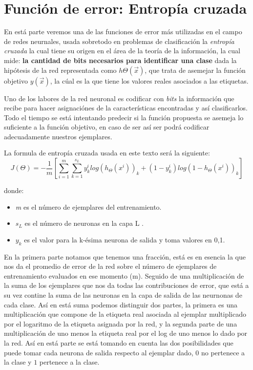 \section{Función de error: Entropía cruzada}
En está parte veremos una de las funciones de error más utilizadas en el campo de redes neurnales, usada sobretodo en problemas de clasificación la \emph{entropía cruzada} la cual tiene su origen en el área de la teoría de la información, la cual mide: \textbf{la cantidad de bits necesarios para identificar una clase} dada la hipótesis de la red representada como $h\Theta (\vec{x}) $, que trata de asemejar la función objetivo $y(\vec{x})$, la cúal es la que tiene los valores reales asociados a las etiquetas.

Uno de los labores de la red neuronal es codificar con \emph{bits} la información que recibe para hacer asignaciónes de la características encontradas y así clasificarlos. Todo el tiempo se está intentando predecir si la función propuesta se asemeja lo suficiente a la función objetivo, en caso de ser así ser podrá codificar adecuadamente nuestros ejemplares.

La formula de entropía cruzada usada en este texto será la siguiente:
 \begin{equation}
  J (\Theta) = -\dfrac{1}{m}\left[\sum_{i=1}^{m}\sum_{k=1}^{s_{L}}y_{k}^{i} log( h_{\Theta}(x^i))_{k}+(1-y_{k}^{i})log(1- h_{\Theta}(x^i))_{k}  \right]  
  \label{entropiaCruzada}
 \end{equation}

 donde:
 \begin{itemize}
  \item \emph{m} es el número de ejemplares del entrenamiento.
  \item \emph{$s_{L}$} es el número de neuronas en la capa L .
  \item \emph{$y_{k}$} es el valor para la k-ésima neurona de salida y toma valores en {0,1}.

 \end{itemize}
  
En la primera parte notamos que tenemos una fracción, está es en esencia la que nos da el promedio de error de la red sobre el número de ejemplares de entrenamiento evaluados en ese momento (m). Seguido de una multiplicación de la suma de los ejemplares que nos da todas las contribuciones de error, que está a su vez contine la suma de las neuronas en la capa de salida de las neurnonas de cada clase. Así en está suma podemos distinguir dos partes, la primera es una multiplicación que compone de la etiqueta real asociada al ejemplar multiplicado por el logaritmo de la etiqueta asignada por la red, y la segunda parte de una multiplicación de uno menos la etiqueta real por el log de uno menos lo dado por la red. Así en está parte se está tomando en cuenta las dos posibilidades que puede tomar cada neurona de salida respecto al ejemplar dado, $0$ no pertenece a la clase y $1$ pertenece a la clase. 

